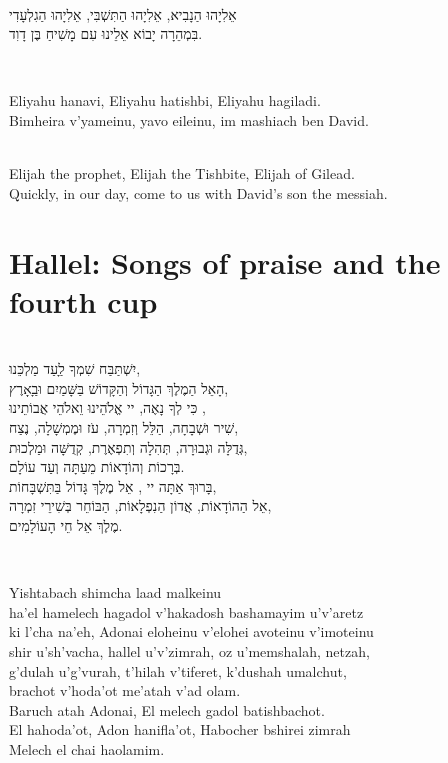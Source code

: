 \documentclass[a4paper,12pt,openany]{memoir}
\newcommand{\HgInst}[1]{{\noindent\sffamily{\bfseries{#1}}}}
\newcommand{\ch}{ch}
\newenvironment{HgHebrew}{\begin{hebrew}\strut\\\noindent\Large}{\end{hebrew}}
\newenvironment{HgHebrewl}{\begin{hebrew}\strut\\\noindent\large}{\end{hebrew}}
\newenvironment{HgEnglish}{\strut\\\noindent}{\vspace{1em}}
\newenvironment{HgTranslit}{\strut\\\noindent\begin{itshape}}{\end{itshape}\vspace{1em}}
\begin{document}
\begin{HgHebrew}
  אֵלִיָהוּ הַנָבִיא, אֵלִיָהוּ הַתִּשְׁבִּי, אֵלִיָהוּ הַגִלְעָדִי 
  \\
  בִּמְהֵרָה יָבוֹא אֵלֵינוּ עִם מָשִׁיחַ בֶּן דָוִד.
\end{HgHebrew}

\begin{HgTranslit}
  Eliyahu hanavi, Eliyahu hatishbi, Eliyahu hagiladi. \\
  Bimheira v'yameinu, yavo eileinu, im mashiach ben David.
\end{HgTranslit}
\vspace{-1em}

\begin{HgEnglish}
  Elijah the prophet, Elijah the Tishbite, Elijah of Gilead. \\
  Quickly, in our day, come to us with David's son the messiah.
\end{HgEnglish}

\vfill

\chapter{Hallel: Songs of praise and the fourth cup}

\HgInst{Recite:}

\begin{HgHebrewl}
  יִשְׁתַּבַּח שִׁמְךָ לַָעַד מַלְכֵּנוּ,  \\
  הָאֵל הַמֶלֶךְ הַגָּדוֹל וְהַקָּדוֹשׁ בַּשָּׁמַיִם וּבַָאָרֶץ, \\
  כִּי לְךָ נָאֶה, יי אֱלֹהֵינוּ וֵאלֹהֵי אֲבוֹתֵינוּ ,  \\
  שִׁיר וּשְׁבָחָה, הַלֵּל וְזִמְרָה, עֹז וּמֶמְשָׁלָה, נֶצַח,  \\
  גְּדֻלָּה וּגְבוּרָה, תְּהִלָה וְתִפְאֶרֶת, קְדֻשָּׁה וּמַלְכוּת, \\
  בְּרָכוֹת וְהוֹדָאוֹת מֵעַתָּה וְעַד עוֹלָם.  \\
  בָּרוּךְ אַתָּה יי , אֵל מֶלֶךְ גָּדוֹל בַּתִּשְׁבָּחוֹת,  \\
  אֵל הַהוֹדָאוֹת, אֲדוֹן הַנִפְלָאוֹת, הַבּוֹחֵר בְּשִׁירֵי זִמְרָה,  \\
  מֶלֶךְ אֵל חֵי הָעוֹלָמִים. 
\end{HgHebrewl}

\begin{HgTranslit}\raggedright
  Yishtaba{\ch} shim{\ch}a laad malkeinu \\
  ha'el hamele{\ch} hagadol v'hakadosh bashamayim u'v'aretz \\
  ki l'{\ch}a na'eh, Adonai eloheinu v'elohei avoteinu v'imoteinu\\
  shir u'sh'va{\ch}a, hallel u'v'zimrah, oz u'memshalah, netzah, \\
  g'dulah u'g'vurah, t'hilah v'tiferet, k'dushah umal{\ch}ut, \\
  bra{\ch}ot v'hoda'ot me'atah v'ad olam. \\
  Baru{\ch} atah Adonai, El mele{\ch} gadol batishba{\ch}ot. \\
  El hahoda'ot, Adon hanifla'ot, Habo{\ch}er bshirei zimrah \\
  Mele{\ch} el {\ch}ai haolamim.
\end{HgTranslit}
\end{document}
